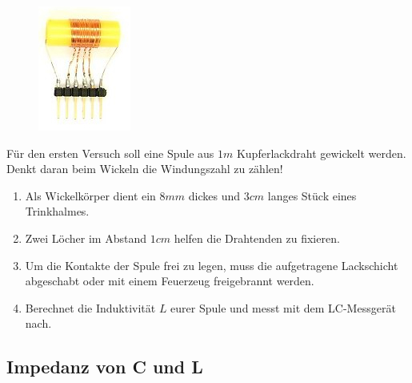 \begin{figure}
 \vspace{-10pt}
 \centering 
 \includegraphics[scale=4]{Spule/Bilder/Spule_bau.jpg}
 \vspace{-5pt}
\end{figure}


Für den ersten Versuch soll eine Spule aus $1 m$ Kupferlackdraht gewickelt
werden. Denkt daran beim Wickeln die Windungszahl zu zählen!

\begin{enumerate}
  \item Als Wickelkörper dient ein $8 mm$ dickes und $3cm$ langes Stück eines
    Trinkhalmes.
  \item Zwei Löcher im Abstand $1cm$ helfen die Drahtenden zu fixieren.
  \item Um die Kontakte der Spule frei zu legen, muss die aufgetragene
    Lackschicht abgeschabt oder mit einem Feuerzeug freigebrannt werden.
  \item Berechnet die Induktivität $L$ eurer Spule und messt mit dem
    LC-Messgerät nach.
\end{enumerate}


\subsection*{Impedanz von C und L}

